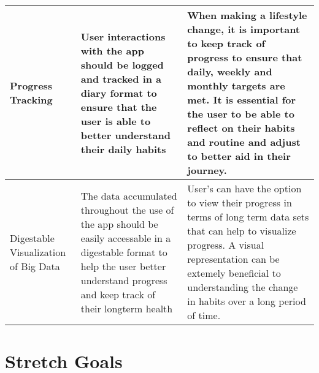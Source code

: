 \documentclass[12pt,letterpaper]{article}
\begin{document}
\begin{longtable}{ |p{3cm}|p{5cm}|p{5cm}| }
 \hline
 Progress Tracking & User interactions with the app should be logged and tracked in a diary format to ensure that the user is able to better understand their daily habits & When making a lifestyle change, it is important to keep track of progress to ensure that daily, weekly and monthly targets are met. It is essential for the user to be able to reflect on their habits and routine and adjust to better aid in their journey.   \\
 \hline
 Digestable Visualization of Big Data & The data accumulated throughout the use of the app should be easily accessable in a digestable format to help the user better understand progress and keep track of their longterm health  & User's can have the option to view their progress in terms of long term data sets that can help to visualize progress. A visual representation can be extemely beneficial to understanding the change in habits over a long period of time.    \\
 \hline
\end{longtable}

\section{Stretch Goals}
\end{document}
